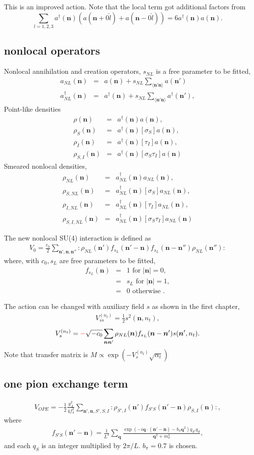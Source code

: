 \documentclass[10pt]{book}
\def\bm{\boldsymbol}
\newcommand{\bea}{\begin{eqnarray}}
\newcommand{\eea}{\end{eqnarray}}
\newcommand{\no}{\nonumber \\}
\def\vn{{\bm n}}
\def\vq{{\bm q}}
\def\la{\langle}
\def\ra{\rangle}
\begin{document}
This is an improved action. Note that the local term got additional factors from 
$$\sum_{l=1,2,3}a^\dagger(\vn)(a(\vn+0\hat{l})+a(\vn-0\hat{l})) =6 a^\dagger(\vn)a(\vn).$$

\subsection{nonlocal operators} 

Nonlocal annihilation and creation operators, $s_{NL}$ is a free parameter to be fitted,
\bea 
a_{NL}(\vn)&=&a(\vn)+s_{NL}\sum_{\la \vn' \vn\ra } a(\vn')\no 
a^\dagger_{NL}(\vn)&=&a^\dagger(\vn)+s_{NL}\sum_{\la \vn' \vn\ra } a^\dagger(\vn'),
\eea 
Point-like densities
\bea 
\rho(\vn)&=&a^\dagger(\vn) a(\vn), \no 
\rho_S(\vn)&=&a^\dagger(\vn)[\sigma_S]a(\vn), \no 
\rho_I(\vn)&=&a^\dagger(\vn)[\tau_I]a(\vn), \no 
\rho_{S,I}(\vn)&=&a^\dagger(\vn)[\sigma_S \tau_I]a(\vn)
\eea 
Smeared nonlocal densities,
\bea 
\rho_{NL}(\vn)&=&a^\dagger_{NL}(\vn) a_{NL}(\vn), \no 
\rho_{S,NL}(\vn)&=&a^\dagger_{NL}(\vn)[\sigma_S]a_{NL}(\vn), \no 
\rho_{I,NL}(\vn)&=&a^\dagger_{NL}(\vn)[\tau_I]a_{NL}(\vn), \no 
\rho_{S,I,NL}(\vn)&=&a^\dagger_{NL}(\vn)[\sigma_S \tau_I]a_{NL}(\vn)
\eea 

The new nonlocal SU(4) interaction is defined as
\bea 
V_0=\frac{c_0}{2}\sum_{\vn',\vn,\vn''} :\rho_{NL}(\vn')f_{s_L}(\vn'-\vn)f_{s_{L}}(\vn-\vn'')\rho_{NL}(\vn''):
\eea 
where, with $c_0, s_L$ are free parameters to be fitted, 
\bea 
f_{s_L}(\vn)&=& 1 \mbox{ for } |\vn|=0, \no 
            &=& s_L \mbox{ for } |\vn|=1, \no 
            &=& 0 \mbox{ otherwise }.
\eea 

The action can be changed with auxiliary field $s$ as shown in the first chapter,
\bea 
V_{ss}^{(n_t)}=\frac{1}{2}s^2(\vn,n_t),
\eea 
\bea 
V_{s}^{(n_t)}={\color{red}-}\sqrt{-c_0}\sum_{\vn\vn'}\rho_{NL}(\vn)f_{s_L}(\vn-\vn')s(\vn',n_t).
\eea 
Note that transfer matrix is $M\propto \exp(-V_s^{(n_t)}\sqrt{\alpha_t})$

\subsection{one pion exchange term}
\bea 
V_{OPE}=-\frac{1}{2}\frac{g_A^2}{4f_\pi^2}\sum_{\vn',\vn,S',S,I} 
         :\rho_{S',I}(\vn')f_{S'S}(\vn'-\vn)\rho_{S,I}(\vn) :, 
\eea  
where
\bea 
f_{S'S}(\vn'-\vn)=\frac{1}{L^3}\sum_{\vq} \frac{\exp(-i\vq\cdot(\vn'-\vn)-b_\pi\vq^2) q_{S'} q_S}{\vq^2+m_\pi^2},
\eea 
and each $q_S$ is an integer multiplied by $2\pi/L$. $b_\pi=0.7$ is chosen.
\end{document}
